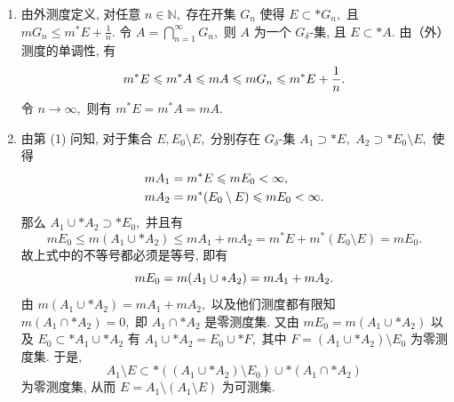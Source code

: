 \begin{solution}
\begin{enumerate}
\item 由外测度定义, 对任意 $n \in \mathbb{N},$ 存在开集 $G_n$ 使得 $E \subset* G_n,$ 且 $m G_n \leqslant m^* E + \frac{1}{n}.$ 
令 $A = \bigcap\limits_{n=1}^{\infty} G_n,$ 则 $A$ 为一个 $G_{\delta}$-集, 且 $E \subset* A.$ 由（外）测度的单调性, 有
\begin{equation*}
m^* E \leqslant m^* A \leqslant m A \leqslant m G_n \leqslant m^* E + \frac{1}{n}. \score{2}
\end{equation*}
令 $n \to \infty,$ 则有 $m^* E = m^* A = m A.$ 

\item 由第 (1) 问知, 对于集合 $E, E_0 \setminus E,$ 分别存在 $G_{\delta}$-集 $A_1 \supset* E,$ $A_2 \supset* E_0 \setminus E,$ 使得
\begin{equation*}
\begin{aligned}
m A_1 & = m^* E \leqslant m E_0 < \infty, \\
m A_2 & = m^* (E_0 \setminus E) \leqslant m E_0 < \infty.
\end{aligned} \score{1}
\end{equation*}
那么 $A_1 \cup* A_2 \supset* E_0,$ 并且有
\begin{equation*}
m E_0 \leqslant m (A_1 \cup* A_2) \leqslant m A_1 + m A_2 = m^* E + m^* (E_0 \setminus E) = m E_0.
\end{equation*}
故上式中的不等号都必须是等号, 即有
\begin{equation*}
m E_0 = m (A_1 \cup* A_2) = m A_1 + m A_2. \score{2}
\end{equation*}
由 $m (A_1 \cup* A_2) = m A_1 + m A_2,$ 以及他们测度都有限知 $m (A_1 \cap* A_2) = 0,$ 即 $A_1 \cap* A_2$ 是零测度集. 又由 $m E_0 = m (A_1 \cup* A_2)$ 以及 $E_0 \subset* A_1 \cup* A_2$ 有 $A_1 \cup* A_2 = E_0 \cup* F,$
其中 $F = (A_1 \cup* A_2) \setminus E_0$ 为零测度集. 于是,
\begin{equation*}
A_1 \setminus E \subset* ((A_1 \cup* A_2) \setminus E_0) \cup* (A_1 \cap* A_2)
\end{equation*}
为零测度集, 从而 $E = A_1 \setminus (A_1 \setminus E)$ 为可测集. 
\end{enumerate}

\end{solution}



